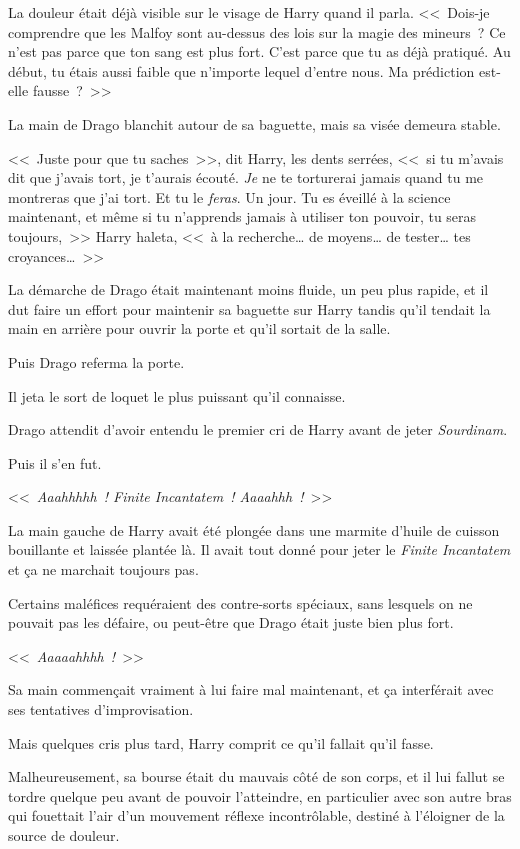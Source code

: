 La douleur était déjà visible sur le visage de Harry quand il parla. <<~Dois-je comprendre que les Malfoy sont au-dessus des lois sur la magie des mineurs~? Ce n'est pas parce que ton sang est plus fort. C'est parce que tu as déjà pratiqué. Au début, tu étais aussi faible que n'importe lequel d'entre nous. Ma prédiction est-elle fausse~?~>>

La main de Drago blanchit autour de sa baguette, mais sa visée demeura stable.

<<~Juste pour que tu saches~>>, dit Harry, les dents serrées, <<~si tu m'avais dit que j'avais tort, je t'aurais écouté. \emph{Je} ne te torturerai jamais quand tu me montreras que j'ai tort. Et tu le \emph{feras}. Un jour. Tu es éveillé à la science maintenant, et même si tu n'apprends jamais à utiliser ton pouvoir, tu seras toujours,~>> Harry haleta, <<~à la recherche… de moyens… de tester… tes croyances…~>>

La démarche de Drago était maintenant moins fluide, un peu plus rapide, et il dut faire un effort pour maintenir sa baguette sur Harry tandis qu'il tendait la main en arrière pour ouvrir la porte et qu'il sortait de la salle.

Puis Drago referma la porte.

Il jeta le sort de loquet le plus puissant qu'il connaisse.

Drago attendit d'avoir entendu le premier cri de Harry avant de jeter \emph{Sourdinam}.

Puis il s'en fut.

\later

<<~\emph{Aaahhhhh~! Finite Incantatem~! Aaaahhh~!}~>>

La main gauche de Harry avait été plongée dans une marmite d'huile de cuisson bouillante et laissée plantée là. Il avait tout donné pour jeter le \emph{Finite Incantatem} et ça ne marchait toujours pas.

Certains maléfices requéraient des contre-sorts spéciaux, sans lesquels on ne pouvait pas les défaire, ou peut-être que Drago était juste bien plus fort.

<<~\emph{Aaaaahhhh~!}~>>

Sa main commençait vraiment à lui faire mal maintenant, et ça interférait avec ses tentatives d'improvisation.

Mais quelques cris plus tard, Harry comprit ce qu'il fallait qu'il fasse.

Malheureusement, sa bourse était du mauvais côté de son corps, et il lui fallut se tordre quelque peu avant de pouvoir l'atteindre, en particulier avec son autre bras qui fouettait l'air d'un mouvement réflexe incontrôlable, destiné à l'éloigner de la source de douleur.


